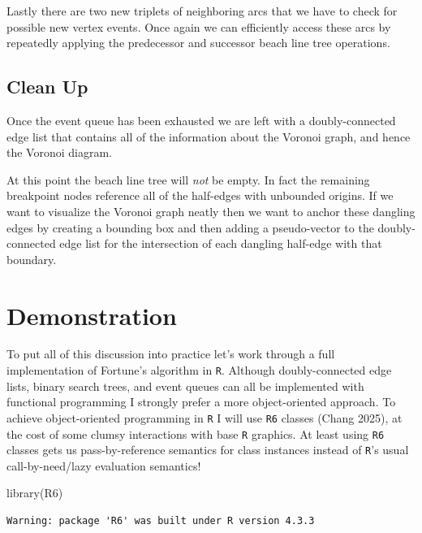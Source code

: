 \documentclass[
  letterpaper,
  DIV=11,
  numbers=noendperiod]{scrartcl}
\newenvironment{Shaded}{\begin{snugshade}}{\end{snugshade}}
\newcommand{\FunctionTok}[1]{\textcolor[rgb]{0.28,0.35,0.67}{#1}}
\newcommand{\NormalTok}[1]{\textcolor[rgb]{0.00,0.23,0.31}{#1}}
\begin{document}
Lastly there are two new triplets of neighboring arcs that we have to
check for possible new vertex events. Once again we can efficiently
access these arcs by repeatedly applying the predecessor and successor
beach line tree operations.

\subsection{Clean Up}\label{clean-up-1}

Once the event queue has been exhausted we are left with a
doubly-connected edge list that contains all of the information about
the Voronoi graph, and hence the Voronoi diagram.

At this point the beach line tree will \emph{not} be empty. In fact the
remaining breakpoint nodes reference all of the half-edges with
unbounded origins. If we want to visualize the Voronoi graph neatly then
we want to anchor these dangling edges by creating a bounding box and
then adding a pseudo-vector to the doubly-connected edge list for the
intersection of each dangling half-edge with that boundary.

\section{Demonstration}\label{demonstration}

To put all of this discussion into practice let's work through a full
implementation of Fortune's algorithm in \texttt{R}. Although
doubly-connected edge lists, binary search trees, and event queues can
all be implemented with functional programming I strongly prefer a more
object-oriented approach. To achieve object-oriented programming in
\texttt{R} I will use \texttt{R6} classes (Chang 2025), at the cost of
some clumsy interactions with base \texttt{R} graphics. At least using
\texttt{R6} classes gets us pass-by-reference semantics for class
instances instead of \texttt{R}'s usual call-by-need/lazy evaluation
semantics!

\begin{Shaded}
\begin{Highlighting}[]
\FunctionTok{library}\NormalTok{(R6)}
\end{Highlighting}
\end{Shaded}

\begin{verbatim}
Warning: package 'R6' was built under R version 4.3.3
\end{verbatim}
\end{document}
